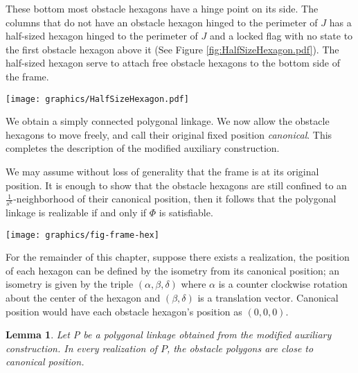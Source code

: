 \documentclass[10pt]{CSUNthesis}
\theoremstyle{plain}%
\newtheorem{lem}{Lemma}
\theoremstyle{definition}
\theoremstyle{remark}
\newcommand{\lr}[1]{\left( #1 \right)}
\begin{document}
\begin{enumerate}
These bottom most obstacle hexagons have a hinge point on its side.
The columns that do not have an obstacle hexagon hinged to the perimeter of $J$ has a half-sized hexagon hinged to the perimeter of $J$ and a locked flag with no state to the first obstacle hexagon above it (See Figure \ref{fig:HalfSizeHexagon.pdf}).  
The half-sized hexagon serve to attach free obstacle hexagons to the bottom side of the frame.

\begin{minipage}{\linewidth}
\begin{center}
\texttt{[image: graphics/HalfSizeHexagon.pdf]}
\label{fig:HalfSizeHexagon.pdf}
\end{center}
\end{minipage}
\end{enumerate}

We obtain a simply connected polygonal linkage. 
We now allow the obstacle hexagons to move freely, and call their original fixed position \emph{canonical}. 
This completes the description of the modified auxiliary construction.  

We may assume without loss of generality that the frame is at its original position. 
It is enough to show that the obstacle hexagons are still confined to an $\frac{1}{s^\kappa}$-neighborhood of their canonical position, then it follows that the polygonal linkage is realizable if and only if $\Phi$ is satisfiable.

\begin{minipage}{\linewidth}
	\begin{center}
	\texttt{[image: graphics/fig-frame-hex]}
	\label{fig:frame}
	\end{center}
\end{minipage}

For the remainder of this chapter, suppose there exists a realization, the position of each hexagon can be defined by the isometry from its canonical position; an isometry is given by the triple $\lr{\alpha, \beta, \delta}$ where $\alpha$ is a counter clockwise rotation about the center of the hexagon and $\lr{\beta,\delta}$ is a translation vector.  
Canonical position would have each obstacle hexagon's position as $(0,0,0)$.
\begin{lem}\label{lem:aux-C}
Let P be a polygonal linkage obtained from the modified auxiliary construction.  
In every realization of $P$, the obstacle polygons are close to canonical position.
\end{lem}
\end{document}
